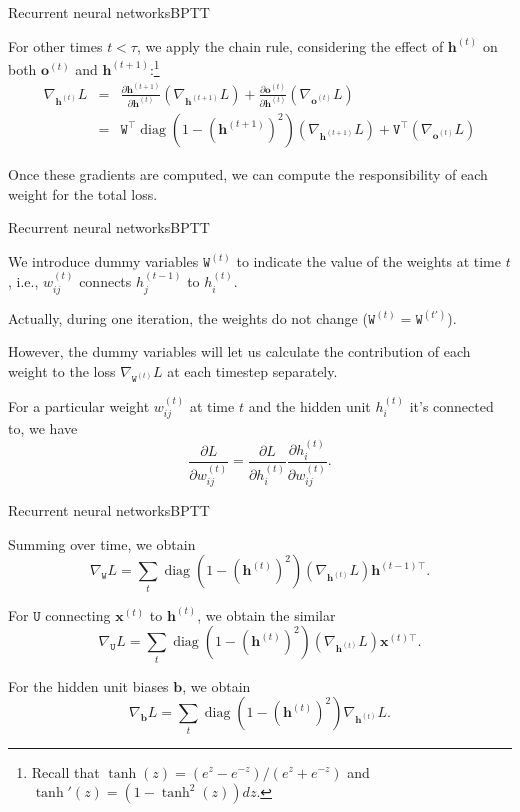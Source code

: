 \documentclass{beamer}
\renewcommand{\vec}[1]{\boldsymbol{#1}}
\newcommand{\mat}[1]{\mathtt{#1}}
\DeclareMathOperator*{\diag}{diag}
\newcommand{\T}[0]{\top}
\begin{document}
\begin{frame}{Recurrent neural networks}{BPTT}

  For other times $t<\tau$, we apply the chain rule, considering the
  effect of $\vec{h}^{(t)}$ on both $\vec{o}^{(t)}$ and
  $\vec{h}^{(t+1)}$:\footnote{Recall that $\tanh(z) =
    (e^{z}-e^{-z})/(e^{z}+e^{-z})$ and $\tanh'(z) = (1 -
    \tanh^2(z))dz$.}
  \begin{eqnarray}
    \nabla_{\vec{h}^{(t)}}L & = &
      \frac{\partial \vec{h}^{(t+1)}}{\partial \vec{h}^{(t)}}
      (\nabla_{\vec{h}^{(t+1)}}L) +
      \frac{\partial \vec{o}^{(t)}}{\partial \vec{h}^{(t)}}
      (\nabla_{\vec{o}^{(t)}}L) \nonumber \\
      & = &
      \mat{W}^\T \diag\left( 1 - \left( \vec{h}^{(t+1)} \right)^2 \right)
      (\nabla_{\vec{h}^{(t+1)}}L) +
      \mat{V}^\T (\nabla_{\vec{o}^{(t)}}L) \nonumber
  \end{eqnarray}

  Once these gradients are computed, we can compute the responsibility of
  each weight for the total loss.

\end{frame}


\begin{frame}{Recurrent neural networks}{BPTT}

  We introduce \alert{dummy variables} $\mat{W}^{(t)}$ to indicate the
  value of the weights at time $t$, i.e., $w_{ij}^{(t)}$ connects
  $h_j^{(t-1)}$ to $h_i^{(t)}$.

  \medskip

  Actually, during one iteration, the weights do not change
  ($\mat{W}^{(t)} = \mat{W}^{(t')}$).

  \medskip
  
  However, the dummy variables will let us calculate the contribution
  of each weight to the loss $\nabla_{\mat{W}^{(t)}}L$ at each
  timestep separately.

  \medskip

  For a particular weight $w^{(t)}_{ij}$ at time $t$ and the hidden
  unit $h^{(t)}_i$ it's connected to, we have
  \[ \frac{\partial L}{\partial w^{(t)}_{ij}} = \frac{\partial L}{\partial h^{(t)}_i} \frac{\partial h^{(t)}_i}{\partial w^{(t)}_{ij}} .\]

\end{frame}


\begin{frame}{Recurrent neural networks}{BPTT}

  Summing over time, we obtain
  \[ \nabla_{\mat{W}}L = \sum_t \diag\left( 1-\left(\vec{h}^{(t)}\right)^2\right)
                       (\nabla_{\vec{h}^{(t)}}L)\vec{h}^{(t-1)\T}. \]

  For $\mat{U}$ connecting $\vec{x}^{(t)}$ to $\vec{h}^{(t)}$, we obtain
  the similar
  \[ \nabla_{\mat{U}}L = \sum_t \diag\left( 1-\left(\vec{h}^{(t)}\right)^2\right)
  (\nabla_{\vec{h}^{(t)}}L)\vec{x}^{(t)\T}. \]

  For the hidden unit biases $\vec{b}$, we obtain
  \[ \nabla_{\vec{b}}L = \sum_t \diag\left( 1-\left(\vec{h}^{(t)}\right)^2\right)
  \nabla_{\vec{h}^{(t)}}L. \]
 
\end{frame}
\end{document}
